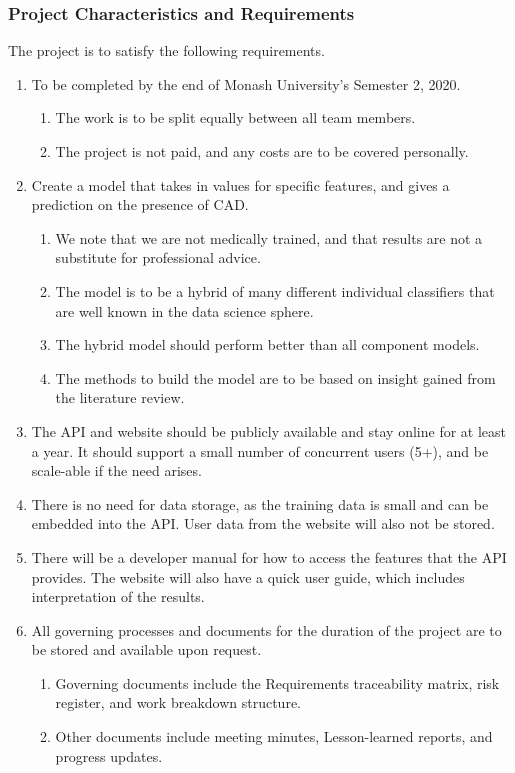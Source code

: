 \documentclass[a4paper, 12pt]{article}
\begin{document}
        \subsubsection{Project Characteristics and Requirements}
        The project is to satisfy the following requirements.
        \begin{enumerate}
            \item To be completed by the end of Monash University's Semester 2, 2020.
            \begin{enumerate}
                \item The work is to be split equally between all team members.
                \item The project is not paid, and any costs are to be covered personally.
            \end{enumerate}
            \item Create a model that takes in values for specific features, and gives a prediction on the presence of CAD.
            \begin{enumerate}
                \item We note that we are not medically trained, and that results are not a substitute for professional advice.
                \item The model is to be a hybrid of many different individual classifiers that are well known in the data science sphere.
                \item The hybrid model should perform better than all component models.
                \item The methods to build the model are to be based on insight gained from the literature review.
            \end{enumerate}
            \item The API and website should be publicly available and stay online for at least a year. It should support a small number of concurrent users (5+), and be scale-able if the need arises.
            
            \item There is no need for data storage, as the training data is small and can be embedded into the API. User data from the website will also not be stored.
            \item There will be a developer manual for how to access the features that the API provides. The website will also have a quick user guide, which includes interpretation of the results.
            \item All governing processes and documents for the duration of the project are to be stored and available upon request.
            \begin{enumerate}
                \item Governing documents include the Requirements traceability matrix, risk register, and work breakdown structure.
                \item Other documents include meeting minutes, Lesson-learned reports, and progress updates.
            \end{enumerate}
        \end{enumerate}
        
\end{document}
